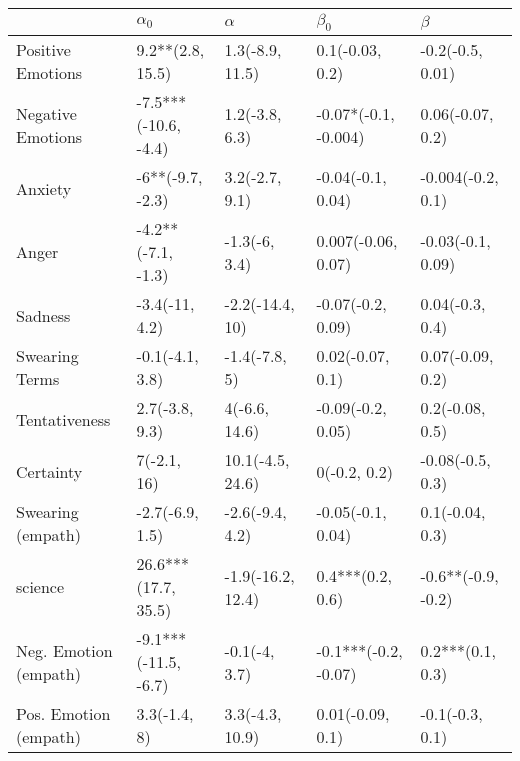 \begin{tabular}{lllll}
\toprule
{} &            $\alpha_0$ &           $\alpha$ &             $\beta_0$ &             $\beta$ \\
\midrule
Positive Emotions     &      9.2**(2.8, 15.5) &    1.3(-8.9, 11.5) &       0.1(-0.03, 0.2) &    -0.2(-0.5, 0.01) \\
Negative Emotions     &  -7.5***(-10.6, -4.4) &     1.2(-3.8, 6.3) &  -0.07*(-0.1, -0.004) &    0.06(-0.07, 0.2) \\
Anxiety               &      -6**(-9.7, -2.3) &     3.2(-2.7, 9.1) &     -0.04(-0.1, 0.04) &   -0.004(-0.2, 0.1) \\
Anger                 &    -4.2**(-7.1, -1.3) &      -1.3(-6, 3.4) &    0.007(-0.06, 0.07) &   -0.03(-0.1, 0.09) \\
Sadness               &        -3.4(-11, 4.2) &    -2.2(-14.4, 10) &     -0.07(-0.2, 0.09) &     0.04(-0.3, 0.4) \\
Swearing Terms        &       -0.1(-4.1, 3.8) &      -1.4(-7.8, 5) &      0.02(-0.07, 0.1) &    0.07(-0.09, 0.2) \\
Tentativeness         &        2.7(-3.8, 9.3) &      4(-6.6, 14.6) &     -0.09(-0.2, 0.05) &     0.2(-0.08, 0.5) \\
Certainty             &           7(-2.1, 16) &   10.1(-4.5, 24.6) &          0(-0.2, 0.2) &    -0.08(-0.5, 0.3) \\
Swearing (empath)     &       -2.7(-6.9, 1.5) &    -2.6(-9.4, 4.2) &     -0.05(-0.1, 0.04) &     0.1(-0.04, 0.3) \\
science               &   26.6***(17.7, 35.5) &  -1.9(-16.2, 12.4) &      0.4***(0.2, 0.6) &  -0.6**(-0.9, -0.2) \\
Neg. Emotion (empath) &  -9.1***(-11.5, -6.7) &      -0.1(-4, 3.7) &  -0.1***(-0.2, -0.07) &    0.2***(0.1, 0.3) \\
Pos. Emotion (empath) &          3.3(-1.4, 8) &    3.3(-4.3, 10.9) &      0.01(-0.09, 0.1) &     -0.1(-0.3, 0.1) \\
\bottomrule
\end{tabular}
